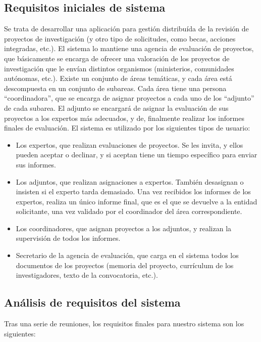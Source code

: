 \documentclass[12pt,a4paper,spanish,twoside]{article}
\begin{document}
\subsection{Requisitos iniciales de sistema}
Se trata de desarrollar una aplicación para gestión distribuída de la
revisión de proyectos de investigación (y otro tipo de solicitudes, como
becas, acciones integradas, etc.). El sistema lo mantiene una agencia de
evaluación de proyectos, que básicamente se encarga de ofrecer una valoración
de los proyectos de investigación que le envían distintos organismos
(ministerios, comunidades autónomas, etc.). Existe un conjunto de áreas
temáticas, y cada área está descompuesta en un conjunto de subareas. Cada
área tiene una persona ``coordinadora'', que se encarga de asignar proyectos
a cada uno de los ``adjunto'' de cada subarea. El adjunto se encargará de
asignar la evaluación de sus proyectos a los expertos más adecuados, y de,
finalmente realizar los informes finales de evaluación. El sistema es
utilizado por los siguientes tipos de usuario: 

\begin{itemize}
\item Los expertos, que realizan evaluaciones de proyectos. Se les invita, y
  ellos pueden aceptar o declinar, y si aceptan tiene un tiempo específico
  para enviar sus informes. 
\item Los adjuntos, que realizan asignaciones a expertos. También desasignan
  o insisten si el experto tarda demasiado. Una vez recibidos los informes de
  los expertos, realiza un único informe final, que es el que se devuelve a
  la entidad solicitante, una vez validado por el coordinador del área
  correspondiente. 
\item Los coordinadores, que asignan proyectos a los adjuntos, y realizan la
  supervisión de todos los informes.
\item Secretario de la agencia de evaluación, que carga en el sistema todos
  los documentos de los proyectos (memoria del proyecto, currículum de los
  investigadores, texto de la convocatoria, etc.). 
\end{itemize}

\subsection{Análisis de requisitos del sistema}
Tras una serie de reuniones, los requisitos finales para nuestro sistema son
los siguientes: 
\end{document}
